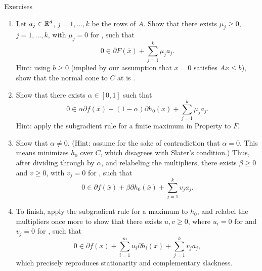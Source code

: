 \begin{xcb}{Exercises}
\begin{enumerate}[label=\thechapter.\arabic*]
\begin{enumerate}[label=\alph*.]
\item Let $a_j \in \mathbb{R}^d$, $j = 1,\dots,k$ be the rows of $A$. Show that there
  exists $\mu_j \geq 0$, $j = 1,\dots,k$, with $\mu_j = 0$ for , such that   
  \[
  0 \in \partial F(\bar{x}) + \sum_{j=1}^k \mu_j a_j.
  \]
  Hint: using $b \geq 0$ (implied by our assumption that $x = 0$ satisfies $Ax
  \leq b$), show that the normal cone to $C$ at  is
  .     

\item Show that there exists $\alpha \in [0,1]$ such that 
  \[
  0 \in \alpha \partial f(\bar{x}) + (1-\alpha) \partial h_0(\bar{x}) +
  \sum_{j=1}^k \mu_j a_j. 
  \]
  Hint: apply the subgradient rule for a finite maximum in Property 
   to $F$. 

\item Show that $\alpha \not= 0$. (Hint: assume for the sake of contradiction
  that $\alpha = 0$. This means  minimizes $h_0$ over $C$,
  which disagrees with Slater's condition.) Thus, after dividing through by
  $\alpha$, and relabeling the multipliers, there exists $\beta \geq 0$ and $v
  \geq 0$, with $v_j = 0$ for , such that     
  \[
  0 \in \partial f(\bar{x}) + \beta \partial h_0(\bar{x}) + \sum_{j=1}^k v_j
  a_j.  
  \]

\item To finish, apply the subgradient rule for a maximum to $h_0$, and relabel
  the multipliers once more to show that there exists $u,v \geq 0$, where $u_i =
  0$ for  and $v_j = 0$ for , such that 
  \[
  0 \in \partial f(\bar{x}) + \sum_{i=1}^m u_i \partial h_i(x) + \sum_{j=1}^k
  v_j a_j, 
  \]
  which precisely reproduces stationarity and complementary slackness.
\end{enumerate}
\end{enumerate}
\end{xcb}